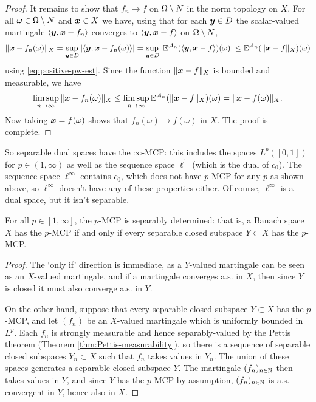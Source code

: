 \begin{proof}
  It remains to show that $f_n \to f$ on $\Omega \setminus N$ in the norm topology on $X$.
  For all $\omega \in \Omega \setminus N$ and $\bm{x} \in X$ we have, using that for each $\bm{y} \in D$ the scalar-valued martingale $\langle \bm{y}, \bm{x} - f_n \rangle$ converges to $\langle \bm{y}, \bm{x} - f \rangle$ on $\Omega \setminus N$, 
  \begin{equation*}
    \|\bm{x} - f_n(\omega)\|_{X}
    = \sup_{\bm{y} \in D} |\langle \bm{y}, \bm{x} - f_n(\omega) \rangle| 
    = \sup_{\bm{y} \in D} |\mathbb{E}^{\mathcal{A}_n} (\langle \bm{y}, \bm{x} - f \rangle)(\omega) | 
    \leq \mathbb{E}^{\mathcal{A}_n}( \|\bm{x} - f\|_{X})(\omega)
  \end{equation*}
  using \eqref{eq:positive-pw-est}.
  Since the function $\|\bm{x} - f\|_{X}$ is bounded and measurable, we have
  \begin{equation*}
    \limsup_{n \to \infty} \|\bm{x} - f_n(\omega)\|_{X} \leq \limsup_{n \to \infty} \mathbb{E}^{\mathcal{A}_n}( \|\bm{x} - f\|_{X})(\omega) = \|\bm{x} - f(\omega)\|_{X}.
  \end{equation*}
  Now taking $\bm{x} = f(\omega)$ shows that $f_n(\omega) \to f(\omega)$ in $X$.
  The proof is complete.  
\end{proof}

So separable dual spaces have the $\infty$-MCP: this includes the spaces $L^p([0,1])$ for $p \in (1,\infty)$ as well as the sequence space $\ell^1$ (which is the dual of $c_0$).
The sequence space $\ell^\infty$ contains $c_0$, which does not have $p$-MCP for any $p$ as shown above, so $\ell^\infty$ doesn't have any of these properties either.
Of course, $\ell^\infty$ is a dual space, but it isn't separable.

\begin{lem}\label{lem:MCP-sepdet}
  For all $p \in [1,\infty]$, the $p$-MCP is separably determined: that is, a Banach space $X$ has the $p$-MCP if and only if every separable closed subspace $Y \subset X$ has the $p$-MCP.
\end{lem}

\begin{proof}
  The `only if' direction is immediate, as a $Y$-valued martingale can be seen as an $X$-valued martingale, and if a martingale converges a.s. in $X$, then since $Y$ is closed it must also converge a.s. in $Y$.

  On the other hand, suppose that every separable closed subspace $Y \subset X$ has the $p$-MCP, and let $(f_n)$ be an $X$-valued martingale which is uniformly bounded in $L^p$.
  Each $f_n$ is strongly measurable and hence separably-valued by the Pettis theorem (Theorem \ref{thm:Pettis-measurability}), so there is a sequence of separable closed subspaces $Y_n \subset X$ such that $f_n$ takes values in $Y_n$.
  The union of these spaces generates a separable closed subspace $Y$.
  The martingale $(f_n)_{n \in \mathbb{N}}$ then takes values in $Y$, and since $Y$ has the $p$-MCP by assumption, $(f_n)_{n \in \mathbb{N}}$ is a.s. convergent in $Y$, hence also in $X$.
\end{proof}


